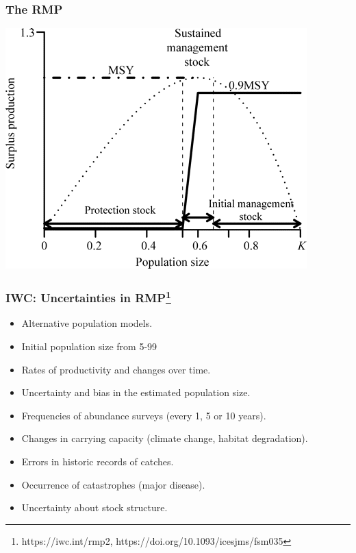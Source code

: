 \documentclass{beamer}
\begin{document}
\begin{frame}
	\frametitle{The RMP}

\centering
\includegraphics[height=0.7\textheight]{figs/nmp}
	
\end{frame}

\begin{frame}
\frametitle{IWC: Uncertainties in RMP\footnote{https://iwc.int/rmp2, https://doi.org/10.1093/icesjms/fsm035}}

\begin{itemize}	
	\item Alternative population models.
	\item Initial population size from 5-99%
	\item Rates of productivity and changes over time.
	\item Uncertainty and bias in the estimated population size.
	\item Frequencies of abundance surveys (every 1, 5 or 10 years).
	\item Changes in carrying capacity (climate change, habitat degradation).
	\item Errors in historic records of catches.
	\item Occurrence of catastrophes (major disease).
	\item Uncertainty about stock structure.
\end{itemize}

\end{frame}
\end{document}
